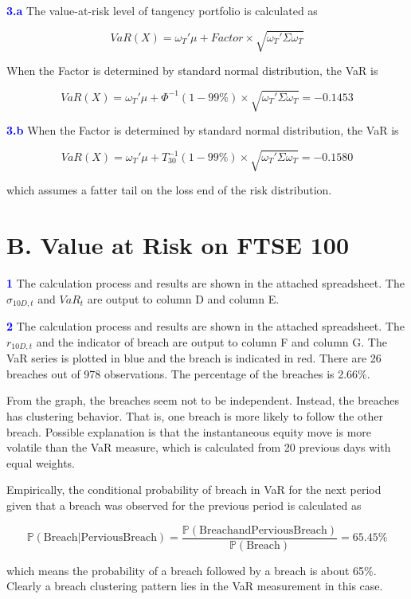 \documentclass[a4paper,11pt] {article}
\begin{document}
\textcolor{blue}{\bf 3.a } The value-at-risk level of tangency portfolio is calculated as

$$
VaR(X) = \omega_T' \mu + Factor \times \sqrt{\omega_T'\Sigma\omega_T}
$$

When the Factor is determined by standard normal distribution, the VaR is

$$
VaR(X) = \omega_T' \mu + \Phi^{-1}(1-99\%) \times \sqrt{\omega_T'\Sigma\omega_T} = -0.1453
$$


\textcolor{blue}{\bf 3.b } When the Factor is determined by standard normal distribution, the VaR is

$$
VaR(X) = \omega_T' \mu + T_30^{-1}(1-99\%) \times \sqrt{\omega_T'\Sigma\omega_T} = -0.1580
$$

which assumes a fatter tail on the loss end of the risk distribution.

\section*{B. Value at Risk on FTSE 100}
\textcolor{blue}{\bf 1 } The calculation process and results are shown in the attached spreadsheet. The $\sigma_{10D,t}$ and $VaR_t$ are output to column D and column E.

\textcolor{blue}{\bf 2 } The calculation process and results are shown in the attached spreadsheet. The $r_{10D,t}$ and the indicator of breach are output to column F and column G. The VaR series is plotted in blue and the breach is indicated in red. There are 26 breaches out of 978 observations. The percentage of the breaches is 2.66\%.

From the graph, the breaches seem not to be independent. Instead, the breaches has clustering behavior. That is, one breach is more likely to follow the other breach. Possible explanation is that the instantaneous equity move is more volatile than the VaR measure, which is calculated from 20 previous days with equal weights. 

Empirically, the conditional probability of breach in VaR for the next period given that a breach was observed for the previous period is calculated as

$$
\mathbb{P}(\mathrm{Breach|Pervious Breach}) = \frac{\mathbb{P}(\mathrm{Breach and Pervious Breach})}{\mathbb{P}(\mathrm{Breach})} = 65.45\%
$$

which means the probability of a breach followed by a breach is about 65\%. Clearly a breach clustering pattern lies in the VaR measurement in this case. 
\end{document}

